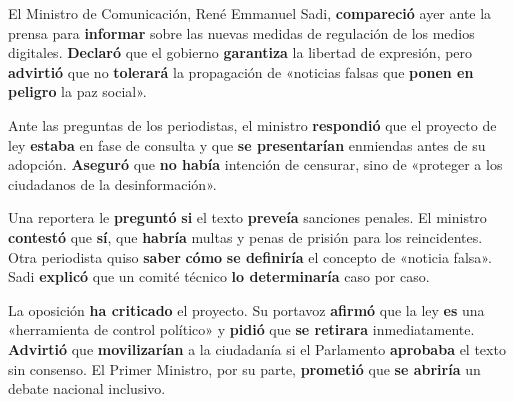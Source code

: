 \documentclass[11pt]{article}
\begin{document}
\begin{textebox}
El Ministro de Comunicación, René Emmanuel Sadi, \textbf{compareció} ayer ante la prensa para \textbf{informar} sobre las nuevas medidas de regulación de los medios digitales. \textbf{Declaró} que el gobierno \textbf{garantiza} la libertad de expresión, pero \textbf{advirtió} que no \textbf{tolerará} la propagación de «noticias falsas que \textbf{ponen en peligro} la paz social».

Ante las preguntas de los periodistas, el ministro \textbf{respondió} que el proyecto de ley \textbf{estaba} en fase de consulta y que \textbf{se presentarían} enmiendas antes de su adopción. \textbf{Aseguró} que \textbf{no había} intención de censurar, sino de «proteger a los ciudadanos de la desinformación».

Una reportera le \textbf{preguntó} \textbf{si} el texto \textbf{preveía} sanciones penales. El ministro \textbf{contestó} que \textbf{sí}, que \textbf{habría} multas y penas de prisión para los reincidentes. Otra periodista quiso \textbf{saber} \textbf{cómo} \textbf{se definiría} el concepto de «noticia falsa». Sadi \textbf{explicó} que un comité técnico \textbf{lo determinaría} caso por caso.

La oposición \textbf{ha criticado} el proyecto. Su portavoz \textbf{afirmó} que la ley \textbf{es} una «herramienta de control político» y \textbf{pidió} que \textbf{se retirara} inmediatamente. \textbf{Advirtió} que \textbf{movilizarían} a la ciudadanía si el Parlamento \textbf{aprobaba} el texto sin consenso. El Primer Ministro, por su parte, \textbf{prometió} que \textbf{se abriría} un debate nacional inclusivo.
\end{textebox}
\end{document}
